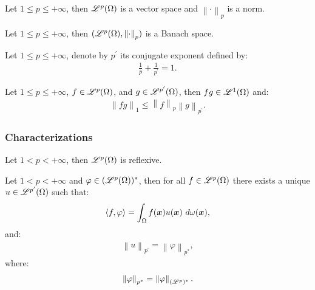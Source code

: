 \begin{theorem}
    Let $1 \leq p \leq +\infty$, then $\mathscr{L}^{p}(\Omega)$ is a vector space and $\left\lVert \cdot \right\rVert_p$ is a norm.
\end{theorem}

\begin{theorem}
    Let $1 \leq p \leq +\infty$, then $(\mathscr{L}^{p}(\Omega), \left\lVert \cdot \right\rVert_p)$ is a Banach space.
\end{theorem}

\begin{definition}
    Let $1 \leq p \leq +\infty$, denote by $p^{\prime}$ its conjugate exponent defined by:
    \begin{align}
        \frac{1}{p} + \frac{1}{p^{\prime}} = 1.
    \end{align}
\end{definition}

\begin{theorem}
    Let $1 \leq p \leq +\infty$, $f \in \mathscr{L}^{p}(\Omega)$, and $g \in \mathscr{L}^{p^{\prime}}(\Omega)$, then $fg \in \mathscr{L}^{1}(\Omega)$ and:
    \begin{align}
        \left\lVert fg \right\rVert_1 \leq \left\lVert f \right\rVert_p \left\lVert g \right\rVert_{p^{\prime}}.
    \end{align}
\end{theorem}

\newpage
\subsubsection{Characterizations}

\begin{theorem}
    Let $1 < p < +\infty$, then $\mathscr{L}^{p}(\Omega)$ is reflexive.
\end{theorem}

\begin{theorem} \label{theorem:riesz_p}
    Let $1 < p < +\infty$ and $\varphi \in (\mathscr{L}^{p}(\Omega))^*$, then for all $f \in \mathscr{L}^{p}(\Omega)$ there exists a unique $u \in \mathscr{L}^{p^{\prime}}(\Omega)$ such that:
    \begin{align}
        \langle f, \varphi \rangle = \int_{\Omega} f(\bm{x}) u(\bm{x}) ~ d \omega(\bm{x}),
    \end{align}
    and:
    \begin{align}
        \left\lVert u \right\rVert_{p^{\prime}} = \left\lVert \varphi \right\rVert_{p^*},
    \end{align}
    where:
    \begin{align}
        \left\lVert \varphi \right\rVert_{p^*} = \left\lVert \varphi \right\rVert_{(\mathscr{L}^{p})^*}.
    \end{align}
\end{theorem}

